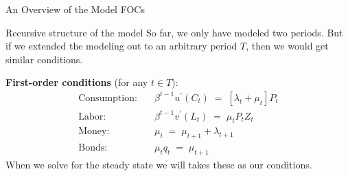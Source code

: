 \documentclass[10pt,c,aspectratio=1610,handout]{beamer}
\begin{document}
\begin{frame}{An Overview of the Model FOCs}%
  \begin{block}{Recursive structure of the model}%
    So far, we only have modeled two periods. But if we extended the modeling out to an arbitrary period $T$, then we would get similar conditions.%
  \end{block}%
  \vspace*{0.15in}%
  \pause%
  \textbf{First-order conditions} (for any $t \in T$):%
  \begin{align*}%
    \text{Consumption:} \quad & \beta^{t-1} u^{\prime} (C_{t}) \; = \; \left[ \lambda_{t} + \mu_{t} \right] P_{t}\\%
    \text{Labor:} \quad & \beta^{t-1} v^{\prime} (L_{t}) \; = \; \mu_{t} P_{t} Z_{t}\\%
    \text{Money:} \quad & \mu_{t} \; = \; \mu_{t+1} + \lambda_{t+1}\\%
    \text{Bonds:} \quad & \mu_{t} q_{t} \; = \; \mu_{t+1}%
  \end{align*}%
  When we solve for the steady state we will takes these as our conditions.%
\end{frame}%
\end{document}
